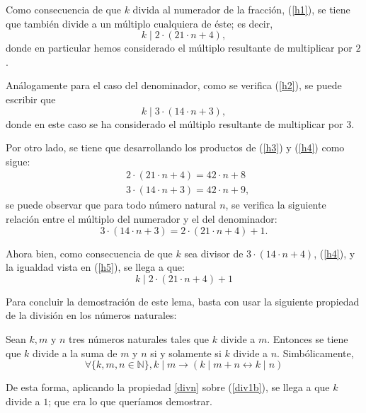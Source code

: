 \begin{demostracion}
  Como consecuencia de que \(k\) divida al numerador de la fracción,
  (\ref{h1}), se tiene que también divide a un múltiplo cualquiera de
  éste; es decir,
  \begin{equation}\label{h3}\tag{h3}
    k \mid 2⋅(21⋅n+4),
  \end{equation}
  donde en particular hemos considerado el múltiplo resultante de
  multiplicar por \(2\).

  Análogamente para el caso del denominador, como se verifica
  (\ref{h2}), se puede escribir que
  \begin{equation}\label{h4}\tag{h4}
    k \mid 3⋅(14⋅n+3),
  \end{equation}
  donde en este caso se ha considerado el múltiplo resultante de
  multiplicar por \(3\).

  Por otro lado, se tiene que desarrollando los productos de (\ref{h3}) y
  (\ref{h4}) como sigue:
  \begin{align}
    & 2⋅(21⋅n+4)=42⋅n+8    \\
    & 3·(14·n+3)=42·n+9,
  \end{align}
  se puede observar que para todo número natural \(n\), se verifica la
  siguiente relación entre el múltiplo del numerador y el del denominador:
  \begin{equation}\label{h5}\tag{h5}
    3⋅(14⋅n+3)=2⋅(21⋅n+4)+1.
  \end{equation}

  Ahora bien, como consecuencia de que \(k\) sea divisor de
  \(3⋅(14⋅n+4)\), (\ref{h4}), y la igualdad vista en (\ref{h5}), se llega
  a que:
  \begin{equation}\label{div1b}
    k \mid 2⋅(21⋅n+4)+1
  \end{equation}

  Para concluir la demostración de este lema, basta con usar la siguiente
  propiedad de la división en los números naturales:

  \begin{proposicion}\label{divn}
    Sean \(k,m\) y \(n\) tres números naturales tales que \(k\) divide a
    \(m\). Entonces se tiene que \(k\) divide a la suma de \(m\) y \(n\)
    si y solamente si \(k\) divide a \(n\). Simbólicamente,
    \begin{equation}
      ∀ \{k, m, n ∈ ℕ\}, k ∣ m → (k ∣ m + n ↔ k ∣ n)
    \end{equation}
  \end{proposicion}

  De esta forma, aplicando la propiedad \ref{divn} sobre (\ref{div1b}),
  se llega a que \(k\) divide a \(1\); que era lo que queríamos
  demostrar.
\end{demostracion}

